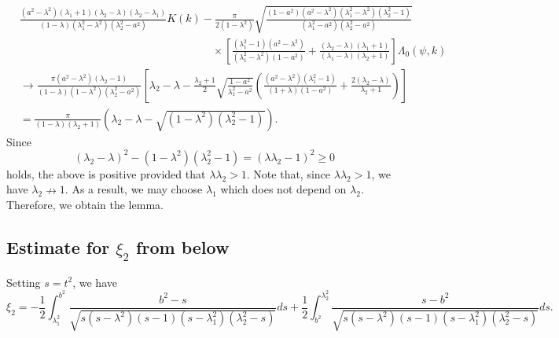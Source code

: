 \documentclass[11pt]{amsart}
\numberwithin{equation}{section}
\numberwithin{figure}{section}
\theoremstyle{plain} %
\theoremstyle{definition} %
\begin{document}
\begin{align*}
& \frac{(a^2-\lambda^2)(\lambda_1+1)(\lambda_2-\lambda)(\lambda_2-\lambda_1)}{(1-\lambda)(\lambda_1^2-\lambda^2)(\lambda_2^2-a^2)} K (k) %
-\frac{\pi}{2(1-\lambda^2)} \sqrt{\frac{(1-a^2)(a^2-\lambda^2)(\lambda_1^2-\lambda^2)(\lambda_2^2-1)}{(\lambda_1^2-a^2)(\lambda_2^2-a^2)}} \\
& \hspace{210pt} \times 
\left[ \frac{(\lambda_1^2-1)(a^2-\lambda^2)}{(\lambda_1^2-\lambda^2)(1-a^2)}+\frac{(\lambda_2-\lambda)(\lambda_1+1)}{(\lambda_1-\lambda)(\lambda_2+1)}  \right] \Lambda_0 (\psi,k) \\
&\to 
\frac{\pi (a^2-\lambda^2)(\lambda_2-1)}{(1-\lambda)(1-\lambda^2)(\lambda_2^2-a^2)} %
\left[ \lambda_2-\lambda
-\frac{\lambda_2+1}{2} \sqrt{\frac{1-a^2}{\lambda_1^2-a^2}} 
\left(
\frac{(a^2-\lambda^2)(\lambda_1^2-1)}{(1+\lambda)(1-a^2)} + \frac{2(\lambda_2-\lambda)}{\lambda_2+1} 
\right)
\right] \\
& 
=\frac{\pi}{(1-\lambda)(\lambda_2+1)} (\lambda_2-\lambda-\sqrt{(1-\lambda^2)(\lambda_2^2-1)}).  
\end{align*}
Since 
\[
(\lambda_2-\lambda)^2-(1-\lambda^2)(\lambda_2^2-1) = (\lambda\lambda_2-1)^2 \geq 0
\]
holds, the above is positive provided that $\lambda\lambda_2>1$. 
Note that, since $\lambda\lambda_2>1$, we have $\lambda_2 \nrightarrow 1$. 
As a result, we may choose $\lambda_1$ which does not depend on $\lambda_2$. 
Therefore, we obtain the lemma. 

\subsection{Estimate for $\xi_2$ from below}

Setting $s=t^2$, we have 
\[
\xi_2 
= -\frac{1}{2}
\int_{\lambda_1^2}^{b^2} \frac{b^2-s}{\sqrt{s(s-\lambda^2)(s-1)(s-\lambda_1^2)(\lambda_2^2-s)}}ds  
 + \frac{1}{2}\int_{b^2}^{\lambda_2^2} \frac{s-b^2}{\sqrt{s(s-\lambda^2)(s-1)(s-\lambda_1^2)(\lambda_2^2-s)}} ds. 
\]
\end{document}
